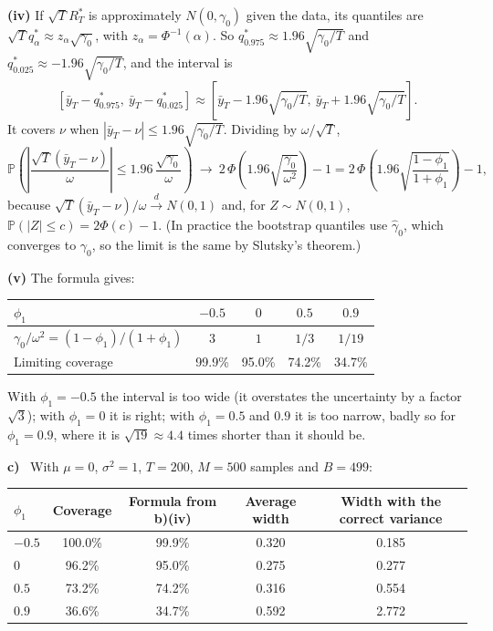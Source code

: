 \documentclass[11pt]{article}
\newcommand{\Prob}{\mathbb{P}}
\newcommand{\itm}[1]{\par\textbf{#1)}\ }
\begin{document}
\textbf{(iv)} If $\sqrt T R^*_T$ is approximately $N(0,\gamma_0)$ given the data, its quantiles are $\sqrt T q^*_\alpha\approx z_\alpha\sqrt{\gamma_0}$, with $z_\alpha=\Phi^{-1}(\alpha)$. So $q^*_{0.975}\approx1.96\sqrt{\gamma_0/T}$ and $q^*_{0.025}\approx-1.96\sqrt{\gamma_0/T}$, and the interval is
\[
\left[\bar y_T-q^*_{0.975},\ \bar y_T-q^*_{0.025}\right]\approx\left[\bar y_T-1.96\sqrt{\gamma_0/T},\ \bar y_T+1.96\sqrt{\gamma_0/T}\right].
\]
It covers $\nu$ when $|\bar y_T-\nu|\le1.96\sqrt{\gamma_0/T}$. Dividing by $\omega/\sqrt T$,
\[
\Prob\left(\left|\frac{\sqrt T(\bar y_T-\nu)}{\omega}\right|\le1.96\,\frac{\sqrt{\gamma_0}}{\omega}\right)\ \longrightarrow\ 2\,\Phi\!\left(1.96\sqrt{\frac{\gamma_0}{\omega^2}}\right)-1 = 2\,\Phi\!\left(1.96\sqrt{\frac{1-\phi_1}{1+\phi_1}}\right)-1,
\]
because $\sqrt T(\bar y_T-\nu)/\omega\xrightarrow{d}N(0,1)$ and, for $Z\sim N(0,1)$, $\Prob(|Z|\le c) = 2\Phi(c)-1$. (In practice the bootstrap quantiles use $\hat\gamma_0$, which converges to $\gamma_0$, so the limit is the same by Slutsky's theorem.)

\textbf{(v)} The formula gives:

\begin{table}[H]
	\centering
	\begin{tabular}{lcccc}
		\toprule
		$\phi_1$ & $-0.5$ & $0$ & $0.5$ & $0.9$ \\
		\midrule
		$\gamma_0/\omega^2 = (1-\phi_1)/(1+\phi_1)$ & $3$ & $1$ & $1/3$ & $1/19$ \\
		Limiting coverage & 99.9\% & 95.0\% & 74.2\% & 34.7\% \\
		\bottomrule
	\end{tabular}
\end{table}

With $\phi_1=-0.5$ the interval is too wide (it overstates the uncertainty by a factor $\sqrt3$); with $\phi_1=0$ it is right; with $\phi_1=0.5$ and $0.9$ it is too narrow, badly so for $\phi_1=0.9$, where it is $\sqrt{19}\approx4.4$ times shorter than it should be.

\itm{c}
With $\mu=0$, $\sigma^2=1$, $T=200$, $M=500$ samples and $B=499$:

\begin{table}[H]
	\centering
	\begin{tabular}{lcccc}
		\toprule
		$\phi_1$ & Coverage & Formula from b)(iv) & Average width & Width with the correct variance \\
		\midrule
		$-0.5$ & 100.0\% & 99.9\% & 0.320 & 0.185 \\
		$0$ & 96.2\% & 95.0\% & 0.275 & 0.277 \\
		$0.5$ & 73.2\% & 74.2\% & 0.316 & 0.554 \\
		$0.9$ & 36.6\% & 34.7\% & 0.592 & 2.772 \\
		\bottomrule
	\end{tabular}
\end{table}
\end{document}
